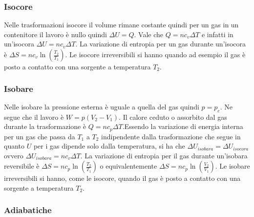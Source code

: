 \documentclass{article}
\begin{document}
\subsubsection*{Isocore}
Nelle trasformazioni isocore il volume rimane costante quindi per un gas in un contenitore il lavoro è nullo quindi $\Delta U=Q$. Vale che $Q= nc_v\Delta T$ e infatti in un'isocora $\Delta U=nc_v\Delta T$. La variazione di entropia per un gas durante un'isocora è $\Delta S=nc_v\ln({\frac{T_2}{T_1}})$. Le isocore irreversibili si hanno quando ad esempio il gas è posto a contatto con una sorgente a temperatura $T_2$. 

\subsubsection*{Isobare}
Nelle isobare la pressione esterna è uguale a quella del gas quindi $p=p_e$. Ne segue che il lavoro è $W=p(V_2-V_1)$. Il calore ceduto o assorbito dal gas durante la trasformazione è $Q=nc_p\Delta T$.Essendo la variazione di energia interna per un gas che passa da $T_1$ a $T_2$ indipendente dalla trasformazione che segue in quanto $U$ per i gas dipende solo dalla temperatura, si ha che $\Delta U_{isobara}= \Delta U_{isocora}$ ovvero $\Delta U_{isobara}=nc_v\Delta T$. La variazione di entropia per il gas durante un'isobara reversibile è $\Delta S=nc_p\ln({\frac{T_2}{T_1}})$ o equivalentemente $\Delta S=nc_p\ln({\frac{V_2}{V_1}})$. Le isobare irreversibili si hanno, come le isocore, quando il gas è posto a contatto con una sorgente a temperatura $T_2$.
\subsubsection*{Adiabatiche}
\end{document}
